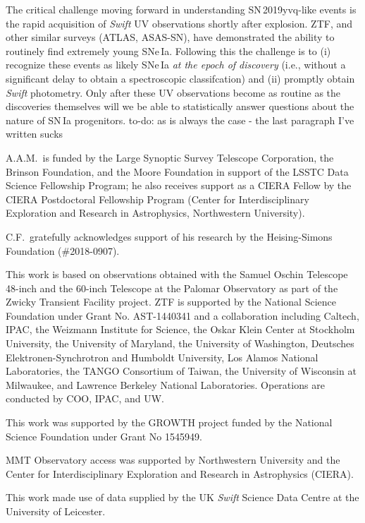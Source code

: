 \documentclass[twocolumn]{aastex63}
\newcommand{\todo}[1]{{\color{magenta} to-do: {#1}}}
\newcommand{\sn}{SN\,2019yvq}
\begin{document}
The critical challenge moving forward in understanding \sn-like events is the
rapid acquisition of \textit{Swift} UV observations shortly after explosion.
ZTF, and other similar surveys (ATLAS, ASAS-SN), have demonstrated the ability
to routinely find extremely young SNe\,Ia. Following this the challenge is to
(i) recognize these events as likely SNe\,Ia \textit{at the epoch of
discovery} (i.e., without a significant delay to obtain a spectroscopic
classifcation) and (ii) promptly obtain \textit{Swift} photometry. Only after
these UV observations become as routine as the discoveries themselves will we
be able to statistically answer questions about the nature of SN\,Ia
progenitors. \todo{as is always the case - the last paragraph I've written
sucks}


\acknowledgements

A.A.M.~is funded by the Large Synoptic Survey Telescope Corporation, the
Brinson Foundation, and the Moore Foundation in support of the LSSTC Data
Science Fellowship Program; he also receives support as a CIERA Fellow by the
CIERA Postdoctoral Fellowship Program (Center for Interdisciplinary
Exploration and Research in Astrophysics, Northwestern University).

C.F.~gratefully acknowledges support of his research by the Heising-Simons
Foundation (\#2018-0907).

This work is based on observations obtained with the Samuel Oschin Telescope
48-inch and the 60-inch Telescope at the Palomar Observatory as part of the
Zwicky Transient Facility project. ZTF is supported by the National Science
Foundation under Grant No. AST-1440341 and a collaboration including Caltech,
IPAC, the Weizmann Institute for Science, the Oskar Klein Center at Stockholm
University, the University of Maryland, the University of Washington,
Deutsches Elektronen-Synchrotron and Humboldt University, Los Alamos National
Laboratories, the TANGO Consortium of Taiwan, the University of Wisconsin at
Milwaukee, and Lawrence Berkeley National Laboratories. Operations are
conducted by COO, IPAC, and UW.

This work was supported by the GROWTH project funded by the National Science
Foundation under Grant No 1545949.

MMT Observatory access was supported by Northwestern University and the
Center for Interdisciplinary Exploration and Research in Astrophysics (CIERA).

This work made use of data supplied by the UK \textit{Swift} Science Data
Centre at the University of Leicester.
\end{document}
